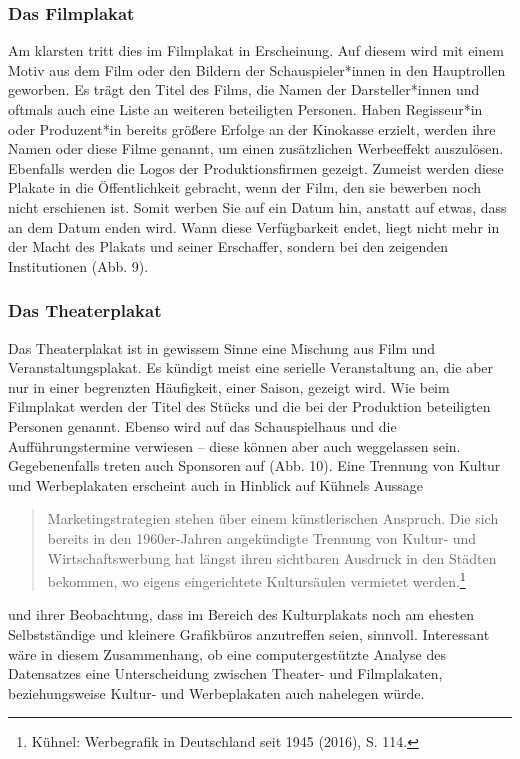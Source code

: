 \documentclass[a4paper,12pt,ngerman]{article}
\begin{document}
\subsubsection{Das Filmplakat}
Am klarsten tritt dies im Filmplakat in Erscheinung. Auf diesem wird mit einem Motiv aus dem Film oder den Bildern der Schauspieler*innen in den Hauptrollen geworben. Es trägt den Titel des Films, die Namen der Darsteller*innen und oftmals auch eine Liste an weiteren beteiligten Personen. Haben Regisseur*in oder Produzent*in bereits größere Erfolge an der Kinokasse erzielt, werden ihre Namen oder diese Filme genannt, um einen zusätzlichen Werbeeffekt auszulösen. Ebenfalls werden die Logos der Produktionsfirmen gezeigt. Zumeist werden diese Plakate in die Öffentlichkeit gebracht, wenn der Film, den sie bewerben noch nicht erschienen ist. Somit werben Sie auf ein Datum hin, anstatt auf etwas, dass an dem Datum enden wird. Wann diese Verfügbarkeit endet, liegt nicht mehr in der Macht des Plakats und seiner Erschaffer, sondern bei den zeigenden Institutionen (Abb. 9). \\

\subsubsection{Das Theaterplakat}
Das Theaterplakat ist in gewissem Sinne eine Mischung aus Film und Veranstaltungsplakat. Es kündigt meist eine serielle Veranstaltung an, die aber nur in einer begrenzten Häufigkeit, einer Saison, gezeigt wird. Wie beim Filmplakat werden der Titel des Stücks und die bei der Produktion beteiligten Personen genannt. Ebenso wird auf das Schauspielhaus und die Aufführungstermine verwiesen – diese können aber auch weggelassen sein. Gegebenenfalls treten auch Sponsoren auf (Abb. 10). Eine Trennung von Kultur und Werbeplakaten erscheint auch in Hinblick auf Kühnels Aussage

\blockquote{\fontsize{10pt}{12pt} \selectfont Marketingstrategien stehen über einem künstlerischen Anspruch. Die sich bereits in den 1960er-Jahren angekündigte Trennung von Kultur- und Wirtschaftswerbung hat längst ihren sichtbaren Ausdruck in den Städten bekommen, wo eigens eingerichtete Kultursäulen vermietet werden.\footnote{Kühnel: Werbegrafik in Deutschland seit 1945 (2016), S. 114.}}

und ihrer Beobachtung, dass im Bereich des Kulturplakats noch am ehesten Selbstständige und kleinere Grafikbüros anzutreffen seien, sinnvoll. Interessant wäre in diesem Zusammenhang, ob eine computergestützte Analyse des Datensatzes eine Unterscheidung zwischen Theater- und Filmplakaten, beziehungsweise Kultur- und Werbeplakaten auch nahelegen würde. \\
\end{document}
